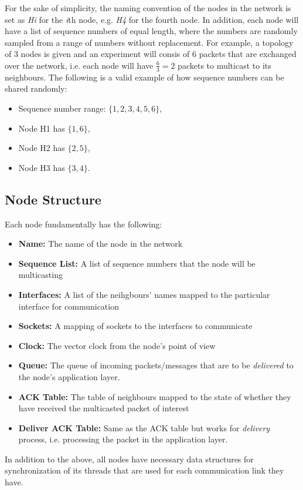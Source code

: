 \documentclass[a4paper, 12pt]{article}
\begin{document}
For the sake of simplicity, the naming convention of the nodes in the network is set as \textit{Hi} for the \textit{i}th node, e.g. \textit{H4} for the fourth node. In addition, each node will have a list of sequence numbers of equal length, where the numbers are randomly sampled from a range of numbers without replacement. For example, a topology of 3 nodes is given and an experiment will consis of 6 packets that are exchanged over the network, i.e. each node will have $\frac{6}{3}=2$ packets to multicast to its neighbours. The following is a valid example of how sequence numbers can be shared randomly:
\begin{itemize}
    \item Sequence number range: $\{1, 2, 3, 4, 5, 6\}$,
    \item Node H1 has $ \{1, 6\}$,
    \item Node H2 has $ \{2, 5\}$,
    \item Node H3 has $ \{3, 4\}$.
\end{itemize}

\subsection{Node Structure}
Each node fundamentally has the following:
\begin{itemize}
    \item \textbf{Name:} The name of the node in the network
    \item \textbf{Sequence List:} A list of sequence numbers that the node will be multicasting
    \item \textbf{Interfaces:} A list of the neihgbours' names mapped to the particular interface for communication
    \item \textbf{Sockets:} A mapping of sockets to the interfaces to communicate
    \item \textbf{Clock:} The vector clock from the node's point of view
    \item \textbf{Queue:} The queue of incoming packets/messages that are to be \textit{delivered} to the node's application layer.
    \item \textbf{ACK Table:} The table of neighbours mapped to the state of whether they have received the multicasted packet of interest
    \item \textbf{Deliver ACK Table:} Same as the ACK table but works for \textit{delivery} process, i.e. processing the packet in the application layer.
\end{itemize}
In addition to the above, all nodes have necessary data structures for synchronization of its threads that are used for each communication link they have.
\end{document}
